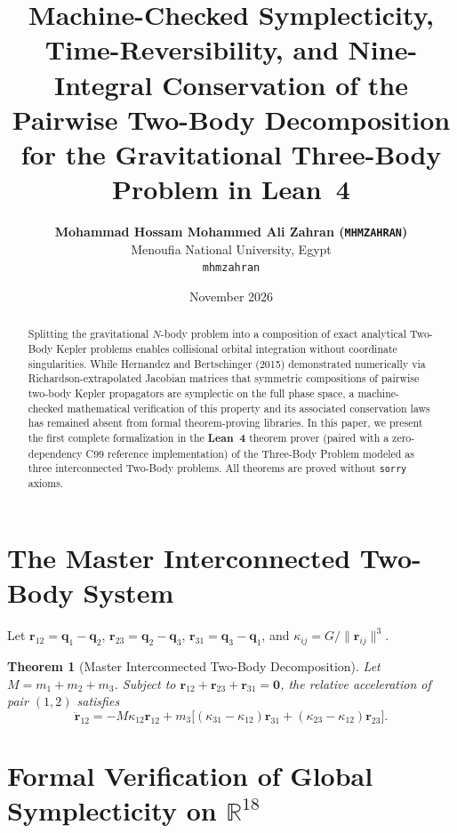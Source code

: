 \documentclass[11pt,a4paper]{article}
\title{\textbf{Machine-Checked Symplecticity, Time-Reversibility, and Nine-Integral Conservation of the Pairwise Two-Body Decomposition for the Gravitational Three-Body Problem in Lean~4}}
\author{
  \textbf{Mohammad Hossam Mohammed Ali Zahran (\texttt{MHMZAHRAN})}\\
  Menoufia National University, Egypt\\
  \texttt{mhmzahran}
}
\date{November 2026}
\newtheorem{theorem}{Theorem}[section]
\begin{document}
\maketitle

\begin{abstract}
Splitting the gravitational $N$-body problem into a composition of exact analytical Two-Body Kepler problems enables collisional orbital integration without coordinate singularities. While Hernandez and Bertschinger (2015) demonstrated numerically via Richardson-extrapolated Jacobian matrices that symmetric compositions of pairwise two-body Kepler propagators are symplectic on the full phase space, a machine-checked mathematical verification of this property and its associated conservation laws has remained absent from formal theorem-proving libraries. In this paper, we present the first complete formalization in the \textbf{Lean~4} theorem prover (paired with a zero-dependency C99 reference implementation) of the Three-Body Problem modeled as three interconnected Two-Body problems. All theorems are proved without \texttt{sorry} axioms.
\end{abstract}

\section{The Master Interconnected Two-Body System}

Let $\mathbf{r}_{12} = \mathbf{q}_1 - \mathbf{q}_2$, $\mathbf{r}_{23} = \mathbf{q}_2 - \mathbf{q}_3$, $\mathbf{r}_{31} = \mathbf{q}_3 - \mathbf{q}_1$, and $\kappa_{ij} = G / \|\mathbf{r}_{ij}\|^3$.

\begin{theorem}[Master Interconnected Two-Body Decomposition]
Let $M = m_1 + m_2 + m_3$. Subject to $\mathbf{r}_{12} + \mathbf{r}_{23} + \mathbf{r}_{31} = \mathbf{0}$, the relative acceleration of pair $(1,2)$ satisfies
\begin{equation}
  \ddot{\mathbf{r}}_{12} = -M \kappa_{12} \mathbf{r}_{12} + m_3 \Big[ (\kappa_{31} - \kappa_{12})\mathbf{r}_{31} + (\kappa_{23} - \kappa_{12})\mathbf{r}_{23} \Big].
\end{equation}
\end{theorem}

\section{Formal Verification of Global Symplecticity on \texorpdfstring{$\mathbb{R}^{18}$}{R18}}
\end{document}
